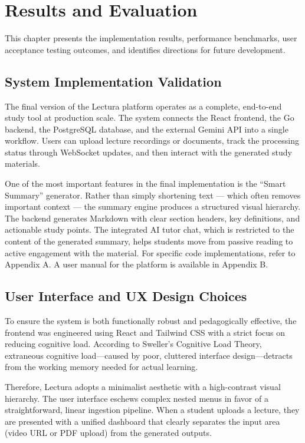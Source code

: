 \chapter{Results and Evaluation}
\label{chap:results}

This chapter presents the implementation results, performance benchmarks, user acceptance testing outcomes, and identifies directions for future development.

\section{System Implementation Validation}
The final version of the Lectura platform operates as a complete, end-to-end study tool at production scale. The system connects the React frontend, the Go backend, the PostgreSQL database, and the external Gemini API into a single workflow. Users can upload lecture recordings or documents, track the processing status through WebSocket updates, and then interact with the generated study materials.

One of the most important features in the final implementation is the ``Smart Summary'' generator. Rather than simply shortening text — which often removes important context — the summary engine produces a structured visual hierarchy. The backend generates Markdown with clear section headers, key definitions, and actionable study points. The integrated AI tutor chat, which is restricted to the content of the generated summary, helps students move from passive reading to active engagement with the material. For specific code implementations, refer to Appendix A. A user manual for the platform is available in Appendix B.

\section{User Interface and UX Design Choices}
To ensure the system is both functionally robust and pedagogically effective, the frontend was engineered using React and Tailwind CSS with a strict focus on reducing cognitive load. According to Sweller's Cognitive Load Theory, extraneous cognitive load—caused by poor, cluttered interface design—detracts from the working memory needed for actual learning. 

Therefore, Lectura adopts a minimalist aesthetic with a high-contrast visual hierarchy. The user interface eschews complex nested menus in favor of a straightforward, linear ingestion pipeline. When a student uploads a lecture, they are presented with a unified dashboard that clearly separates the input area (video URL or PDF upload) from the generated outputs.

